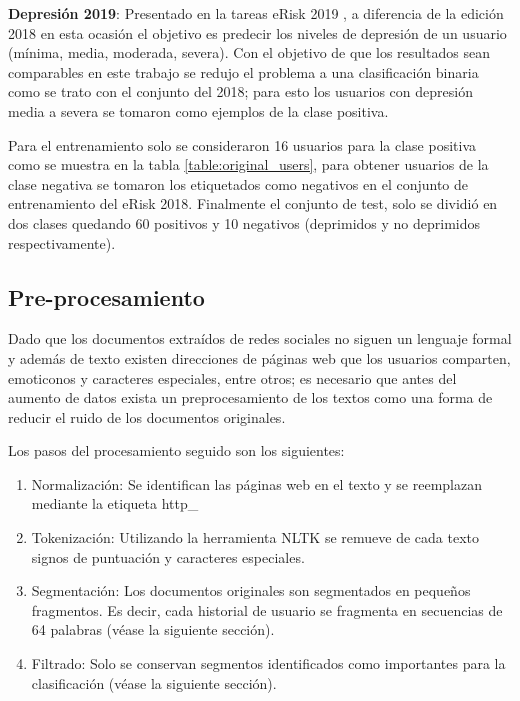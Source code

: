 \textbf{Depresión 2019}: Presentado en la tareas eRisk 2019 \cite{Losada2019}, a diferencia de la edición 2018 en esta ocasión el objetivo es predecir los niveles de depresión de un usuario (mínima, media, moderada, severa). Con el objetivo de que los resultados sean comparables en este trabajo se redujo el problema a una clasificación binaria como se trato con el conjunto del 2018; para esto los usuarios con depresión media a severa se tomaron como ejemplos de la clase positiva.

Para el entrenamiento solo se consideraron 16 usuarios para la clase positiva como se muestra en la tabla \ref{table:original_users}, para obtener usuarios de la clase negativa se tomaron los etiquetados como negativos en el conjunto de entrenamiento del eRisk 2018. Finalmente el conjunto de test, solo se dividió en dos clases quedando 60 positivos y 10 negativos (deprimidos y no deprimidos respectivamente).







\subsection{Pre-procesamiento}

Dado que los documentos extraídos de redes sociales no siguen un lenguaje formal y además de texto existen direcciones de páginas web que los usuarios comparten, emoticonos y caracteres especiales, entre otros; es necesario que antes del aumento de datos exista un preprocesamiento de los textos como una forma de reducir el ruido de los documentos originales.

Los pasos del procesamiento seguido son los siguientes:

 \begin{enumerate}
     \item Normalización: Se identifican las páginas web en el texto y se reemplazan mediante la etiqueta http\_
     \item Tokenización: Utilizando la herramienta NLTK se remueve de cada texto signos de puntuación y caracteres especiales.
     \item Segmentación: Los documentos originales son segmentados en pequeños fragmentos. Es decir, cada historial de usuario se fragmenta en secuencias de 64 palabras  (véase la siguiente sección).
     \item Filtrado: Solo se conservan segmentos identificados como importantes para la clasificación (véase la siguiente sección).
 \end{enumerate}




